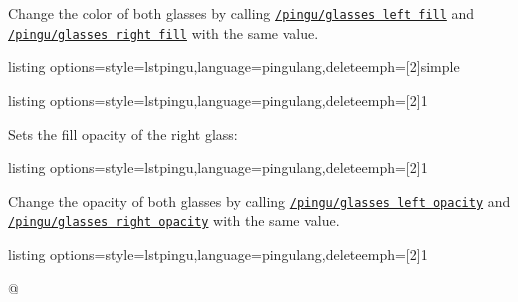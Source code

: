 \documentclass[parskip=half,english,numbers=noenddot,footnotes=nomultiple,oneside]{scrartcl}
\def\lpingu#1{\lstinline[style=lstpingu,language=pingulang]'#1'}
\newcommand*\keyref[2][/pingu/]{\hyperref[pk:#1#2]{\lpingu{#1#2}}}
\begin{document}
	Change the color of both glasses by calling \keyref{glasses left fill} and \keyref{glasses right fill} with the same value.
\begin{tcblisting}{listing options={style=lstpingu,language=pingulang,deleteemph={[2]{simple}}}}
\begin{tikzpicture}
	\pingu[glasses, glasses fill=green]
\end{tikzpicture}
\end{tcblisting}
\endsubkeyexplain

\begin{tcblisting}{listing options={style=lstpingu,language=pingulang,deleteemph={[2]{1}}}}
\begin{tikzpicture}
	\pingu[glasses,
	       glasses left fill=green,
				 glasses left opacity=1]
\end{tikzpicture}
\end{tcblisting}
\endsubkeyexplain

	Sets the fill opacity of the right glass:
\begin{tcblisting}{listing options={style=lstpingu,language=pingulang,deleteemph={[2]{1}}}}
\begin{tikzpicture}
	\pingu[glasses,
	       glasses right fill=green,
				 glasses right opacity=1]
\end{tikzpicture}
\end{tcblisting}
\endsubkeyexplain

	Change the opacity of both glasses by calling \keyref{glasses left opacity} and \keyref{glasses right opacity} with the same value.
\begin{tcblisting}{listing options={style=lstpingu,language=pingulang,deleteemph={[2]{1}}}}
\begin{tikzpicture}
	\pingu[glasses,
		glasses fill=teal,
		glasses opacity=1]
\end{tikzpicture}
\end{tcblisting}
\endsubkeyexplain

\begin{tcblisting}{@}
\begin{tikzpicture}
	\pingu[glasses, glasses line width=1mm]
\end{tikzpicture}
\end{tcblisting}
\endsubkeyexplain
\end{document}
